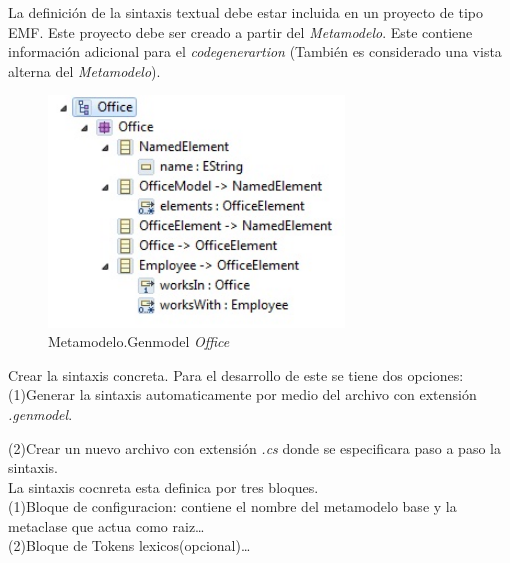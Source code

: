 {\begin{figure}[h]
 \end{figure}
 \item{La definición de la sintaxis textual debe estar incluida en un proyecto de tipo EMF. Este proyecto debe ser creado a partir del \textit{Metamodelo}. 
 Este contiene información adicional para el \textit{codegenerartion} (También es considerado una vista alterna del \textit{Metamodelo})}. 
 \begin{center}
 \par
 \end{center}
 \begin{figure}[h]
 \begin{center}
 \includegraphics[width=0.7\textwidth] 
 {img/MetamodeloGenmodel.jpg}
 \caption{Metamodelo.Genmodel \textit{Office}} \label{}
 \end{center}
 \end{figure}
 \item{Crear la sintaxis concreta. Para el desarrollo de este se tiene dos opciones: (1)Generar la sintaxis automaticamente por medio del archivo con extensión \textit{.genmodel}}.\\
 \begin{center}
 \par
 \end{center}
 (2)Crear un nuevo archivo con extensión \textit{.cs} donde se especificara paso a paso la sintaxis.\\
 La sintaxis cocnreta esta definica por tres bloques.\\
 (1)Bloque de configuracion: contiene el nombre del metamodelo base y la metaclase que actua como raiz\ldots\\
 (2)Bloque de Tokens lexicos(opcional)\ldots\\
}
